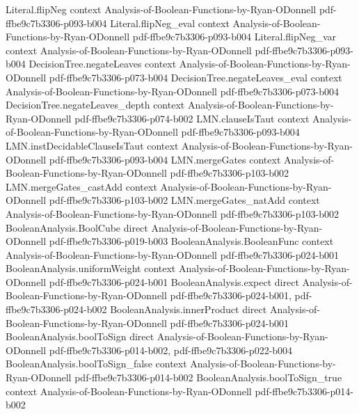 \begin{lemma}
\proofstep
  {Literal.flipNeg}
  {context}
  {Analysis-of-Boolean-Functions-by-Ryan-ODonnell}
  {pdf-ffbe9c7b3306-p093-b004}
\proofstep
  {Literal.flipNeg_eval}
  {context}
  {Analysis-of-Boolean-Functions-by-Ryan-ODonnell}
  {pdf-ffbe9c7b3306-p093-b004}
\proofstep
  {Literal.flipNeg_var}
  {context}
  {Analysis-of-Boolean-Functions-by-Ryan-ODonnell}
  {pdf-ffbe9c7b3306-p093-b004}
\proofstep
  {DecisionTree.negateLeaves}
  {context}
  {Analysis-of-Boolean-Functions-by-Ryan-ODonnell}
  {pdf-ffbe9c7b3306-p073-b004}
\proofstep
  {DecisionTree.negateLeaves_eval}
  {context}
  {Analysis-of-Boolean-Functions-by-Ryan-ODonnell}
  {pdf-ffbe9c7b3306-p073-b004}
\proofstep
  {DecisionTree.negateLeaves_depth}
  {context}
  {Analysis-of-Boolean-Functions-by-Ryan-ODonnell}
  {pdf-ffbe9c7b3306-p074-b002}
\proofstep
  {LMN.clauseIsTaut}
  {context}
  {Analysis-of-Boolean-Functions-by-Ryan-ODonnell}
  {pdf-ffbe9c7b3306-p093-b004}
\proofstep
  {LMN.instDecidableClauseIsTaut}
  {context}
  {Analysis-of-Boolean-Functions-by-Ryan-ODonnell}
  {pdf-ffbe9c7b3306-p093-b004}
\proofstep
  {LMN.mergeGates}
  {context}
  {Analysis-of-Boolean-Functions-by-Ryan-ODonnell}
  {pdf-ffbe9c7b3306-p103-b002}
\proofstep
  {LMN.mergeGates_castAdd}
  {context}
  {Analysis-of-Boolean-Functions-by-Ryan-ODonnell}
  {pdf-ffbe9c7b3306-p103-b002}
\proofstep
  {LMN.mergeGates_natAdd}
  {context}
  {Analysis-of-Boolean-Functions-by-Ryan-ODonnell}
  {pdf-ffbe9c7b3306-p103-b002}
\proofstep
  {BooleanAnalysis.BoolCube}
  {direct}
  {Analysis-of-Boolean-Functions-by-Ryan-ODonnell}
  {pdf-ffbe9c7b3306-p019-b003}
\proofstep
  {BooleanAnalysis.BooleanFunc}
  {context}
  {Analysis-of-Boolean-Functions-by-Ryan-ODonnell}
  {pdf-ffbe9c7b3306-p024-b001}
\proofstep
  {BooleanAnalysis.uniformWeight}
  {context}
  {Analysis-of-Boolean-Functions-by-Ryan-ODonnell}
  {pdf-ffbe9c7b3306-p024-b001}
\proofstep
  {BooleanAnalysis.expect}
  {direct}
  {Analysis-of-Boolean-Functions-by-Ryan-ODonnell}
  {pdf-ffbe9c7b3306-p024-b001,
    pdf-ffbe9c7b3306-p024-b002}
\proofstep
  {BooleanAnalysis.innerProduct}
  {direct}
  {Analysis-of-Boolean-Functions-by-Ryan-ODonnell}
  {pdf-ffbe9c7b3306-p024-b001}
\proofstep
  {BooleanAnalysis.boolToSign}
  {direct}
  {Analysis-of-Boolean-Functions-by-Ryan-ODonnell}
  {pdf-ffbe9c7b3306-p014-b002,
    pdf-ffbe9c7b3306-p022-b004}
\proofstep
  {BooleanAnalysis.boolToSign_false}
  {context}
  {Analysis-of-Boolean-Functions-by-Ryan-ODonnell}
  {pdf-ffbe9c7b3306-p014-b002}
\proofstep
  {BooleanAnalysis.boolToSign_true}
  {context}
  {Analysis-of-Boolean-Functions-by-Ryan-ODonnell}
  {pdf-ffbe9c7b3306-p014-b002}

\end{lemma}
